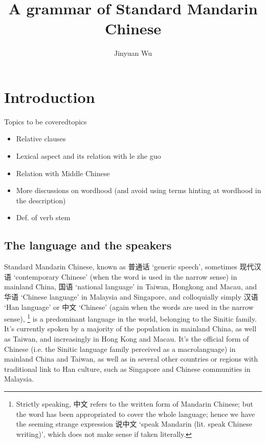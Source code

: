 \documentclass[UTF8, a4paper, oneside, scheme=plain, 12pt]{ctexrep}
\title{A grammar of Standard Mandarin Chinese}
\author{Jinyuan Wu}
\newcommand{\translate}[1]{`#1'}
\begin{document}
\automath

\maketitle

\chapter{Introduction}

\begin{todobox}{Topics to be covered}{topics}
    \begin{itemize}
        \item Relative clauses 
        \item Lexical aspect and its relation with le zhe guo
        \item Relation with Middle Chinese
        \item More discussions on wordhood (and avoid using terms hinting at wordhood in the description)
        \item Def. of verb stem
    \end{itemize}
\end{todobox}

\section{The language and the speakers}

Standard Mandarin Chinese,
known as 普通话 \translate{generic speech}, 
sometimes 现代汉语 \translate{contemporary Chinese} 
(when the word is used in the narrow sense) 
in mainland China, 
国语 \translate{national language} in Taiwan, Hongkong and Macau,
and 华语 \translate{Chinese language} in Malaysia and Singapore,
and colloquially simply 汉语 \translate{Han language} or 中文 \translate{Chinese}
(again when the words are used in the narrow sense),%
\footnote{
    Strictly speaking, 中文 refers to the written form of Mandarin Chinese; 
    but the word has been appropriated to cover the whole language; 
    hence we have the seeming strange expression 
    说中文 \translate{speak Mandarin (lit. speak Chinese writing)},
    which does not make sense if taken literally.
}
is a predominant language in the world,
belonging to the Sinitic family.
It's currently spoken by a majority of the population in mainland China,
as well as Taiwan, 
and increasingly in Hong Kong and Macau.
It's the official form of Chinese 
(i.e. the Sinitic language family perceived as a macrolanguage)
in mainland China and Taiwan, 
as well as in several other countries or regions 
with traditional link to Han culture, 
such as Singapore and Chinese communities in Malaysia. 
\end{document}
